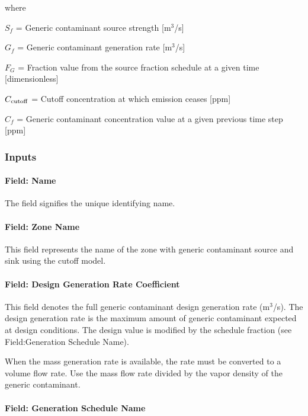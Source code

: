 where

\(S_{f}\) = Generic contaminant source strength {[}m\(^{3}\)/s{]}

\(G_{f}\) = Generic contaminant generation rate {[}m\(^{3}\)/s{]}

\(F_{G}\) = Fraction value from the source fraction schedule at a given time {[}dimensionless{]}

\(C_{\rm{cutoff}}\) = Cutoff concentration at which emission ceases {[}ppm{]}

\(C_{f}\) = Generic contaminant concentration value at a given previous time step {[}ppm{]}

\subsubsection{Inputs}\label{inputs-13-006}

\paragraph{Field: Name}\label{field-name-13-005}

The field signifies the unique identifying name.

\paragraph{Field: Zone Name}\label{field-zone-name-4-002}

This field represents the name of the zone with generic contaminant source and sink using the cutoff model.

\paragraph{Field: Design Generation Rate Coefficient}\label{field-design-generation-rate-coefficient-1}

This field denotes the full generic contaminant design generation rate (m\(^{3}\)/s). The design generation rate is the maximum amount of generic contaminant expected at design conditions. The design value is modified by the schedule fraction (see Field:Generation Schedule Name).

When the mass generation rate is available, the rate must be converted to a volume flow rate. Use the mass flow rate divided by the vapor density of the generic contaminant.

\paragraph{Field: Generation Schedule Name}\label{field-generation-schedule-name-1}

